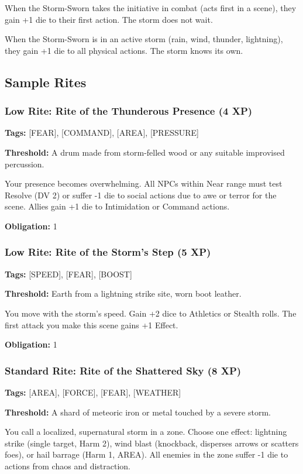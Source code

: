 When the Storm-Sworn takes the initiative in combat (acts first in a scene), they gain +1 die to their first action. The storm does not wait.

When the Storm-Sworn is in an active storm (rain, wind, thunder, lightning), they gain +1 die to all physical actions. The storm knows its own.

\subsection{Sample Rites}

\subsubsection{Low Rite: Rite of the Thunderous Presence (4 XP)}

\textbf{Tags:} [FEAR], [COMMAND], [AREA], [PRESSURE]

\textbf{Threshold:} A drum made from storm-felled wood or any suitable improvised percussion.

Your presence becomes overwhelming. All NPCs within Near range must test Resolve (DV 2) or suffer -1 die to social actions due to awe or terror for the scene. Allies gain +1 die to Intimidation or Command actions.

\textbf{Obligation:} 1

\subsubsection{Low Rite: Rite of the Storm's Step (5 XP)}

\textbf{Tags:} [SPEED], [FEAR], [BOOST]

\textbf{Threshold:} Earth from a lightning strike site, worn boot leather.

You move with the storm's speed. Gain +2 dice to Athletics or Stealth rolls. The first attack you make this scene gains +1 Effect.

\textbf{Obligation:} 1

\subsubsection{Standard Rite: Rite of the Shattered Sky (8 XP)}

\textbf{Tags:} [AREA], [FORCE], [FEAR], [WEATHER]

\textbf{Threshold:} A shard of meteoric iron or metal touched by a severe storm.

You call a localized, supernatural storm in a zone. Choose one effect: lightning strike (single target, Harm 2), wind blast (knockback, disperses arrows or scatters foes), or hail barrage (Harm 1, AREA). All enemies in the zone suffer -1 die to actions from chaos and distraction.

